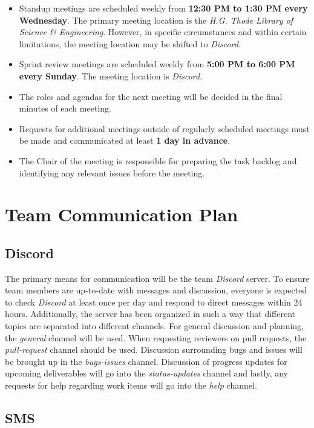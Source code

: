\documentclass{article}
\begin{document}
\begin{itemize}
	\item Standup meetings are scheduled weekly from \textbf{12:30 PM to 1:30 PM every Wednesday}. The primary meeting location is the \emph{H.G. Thode Library of Science \& Engineering}. However, in specific circumstances and within certain limitations, the meeting location may be shifted to \emph{Discord}.
    	\item Sprint review meetings are scheduled weekly from \textbf{5:00 PM to 6:00 PM every Sunday}. The meeting location is \emph{Discord}.
    	\item The roles and agendas for the next meeting will be decided in the final minutes of each meeting.
    	\item Requests for additional meetings outside of regularly scheduled meetings must be made and communicated at least \textbf{1 day in advance}.
   	\item The Chair of the meeting is responsible for preparing the task backlog and identifying any relevant issues before the meeting.
\end{itemize}

\section{Team Communication Plan}

\subsection{Discord}

The primary means for communication will be the team \emph{Discord} server. To
ensure team members are up-to-date with messages and discussion, everyone is expected to check \emph{Discord}
at least once per day and respond to direct messages within 24 hours.
Additionally, the server has been organized in such a way that different topics are separated into different channels.
For general discussion and planning, the \emph{general} channel will be used. When requesting reviewers on pull requests,
the \emph{pull-request} channel should be used. Discussion surrounding bugs and issues will be brought up in the
\emph{bugs-issues} channel. Discussion of progress updates for upcoming deliverables will go into the
\emph{status-updates} channel and lastly, any requests for help regarding work items will go into the \emph{help} channel.

\subsection{SMS}
\end{document}
